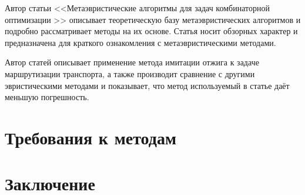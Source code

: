 Автор статьи <<Метаэвристические алгоритмы для задач комбинаторной оптимизации >>\cite{bib:48} описывает 
теоретическую базу метаэвристических алгоритмов и подробно рассматривает методы на их основе. Статья носит 
обзорных характер и предназначена для краткого ознакомления с метаэвристическими методами.

Автор статей \cite{bib:50,bib:51} описывает применение метода имитации отжига к задаче маршрутизации 
транспорта, а также производит сравнение с другими эвристическими методами и показывает, что метод 
используемый в статье даёт меньшую погрешность.


\section{Требования к методам}
\section{Заключение}